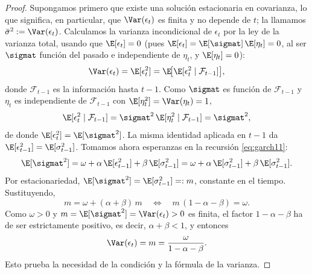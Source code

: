 \begin{proof}
Supongamos primero que existe una solución estacionaria en covarianza, lo que significa, en particular, que $\Var(\epsilon_t)$ es finita y no depende de $t$; la llamamos $\bar{\sigma}^2 := \Var(\epsilon_t)$. Calculamos la varianza incondicional de $\epsilon_t$ por la ley de la varianza total, usando que $\E[\epsilon_t] = 0$ (pues $\E[\epsilon_t] = \E[\sigmat]\,\E[\eta_t] = 0$, al ser $\sigmat$ función del pasado e independiente de $\eta_t$, y $\E[\eta_t]=0$):
\[
\Var(\epsilon_t) = \E[\epsilon_t^2] = \E\!\big[\E[\epsilon_t^2 \mid \mathcal{F}_{t-1}]\big],
\]
donde $\mathcal{F}_{t-1}$ es la información hasta $t-1$. Como $\sigmat$ es función de $\mathcal{F}_{t-1}$ y $\eta_t$ es independiente de $\mathcal{F}_{t-1}$ con $\E[\eta_t^2] = \Var(\eta_t) = 1$,
\[
\E[\epsilon_t^2 \mid \mathcal{F}_{t-1}] = \sigmat^2\, \E[\eta_t^2 \mid \mathcal{F}_{t-1}] = \sigmat^2,
\]
de donde $\E[\epsilon_t^2] = \E[\sigmat^2]$. La misma identidad aplicada en $t-1$ da $\E[\epsilon_{t-1}^2] = \E[\sigma_{t-1}^2]$. Tomamos ahora esperanzas en la recursión \eqref{eq:garch11}:
\[
\E[\sigmat^2] = \omega + \alpha\, \E[\epsilon_{t-1}^2] + \beta\, \E[\sigma_{t-1}^2]
= \omega + \alpha\, \E[\sigma_{t-1}^2] + \beta\, \E[\sigma_{t-1}^2].
\]
Por estacionariedad, $\E[\sigmat^2] = \E[\sigma_{t-1}^2] =: m$, constante en el tiempo. Sustituyendo,
\[
m = \omega + (\alpha + \beta)\, m
\quad\Longleftrightarrow\quad
m\,(1 - \alpha - \beta) = \omega.
\]
Como $\omega > 0$ y $m = \E[\sigmat^2] = \Var(\epsilon_t) > 0$ es finita, el factor $1 - \alpha - \beta$ ha de ser estrictamente positivo, es decir, $\alpha + \beta < 1$, y entonces
\[
\Var(\epsilon_t) = m = \frac{\omega}{1 - \alpha - \beta}.
\]
Esto prueba la necesidad de la condición y la fórmula de la varianza.


\end{proof}

